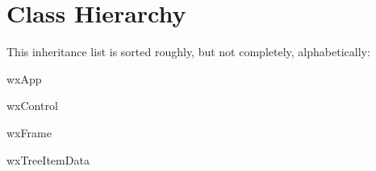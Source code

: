 \section{Class Hierarchy}
This inheritance list is sorted roughly, but not completely, alphabetically\+:\begin{DoxyCompactList}
\item {}
\item {}
\item wx\+App\begin{DoxyCompactList}
\item {}
\end{DoxyCompactList}
\item wx\+Control\begin{DoxyCompactList}
\item {}
\end{DoxyCompactList}
\item wx\+Frame\begin{DoxyCompactList}
\item {}
\end{DoxyCompactList}
\item wx\+Tree\+Item\+Data\begin{DoxyCompactList}
\item {}
\end{DoxyCompactList}
\end{DoxyCompactList}
